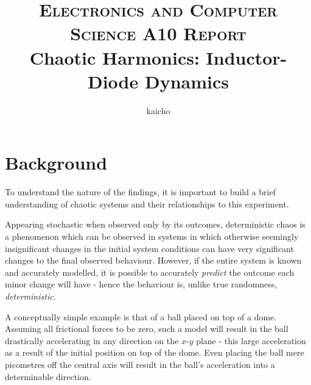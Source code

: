 \documentclass[10pt,twocolumn,letterpaper]{article}
\title{
		\usefont{OT1}{bch}{b}{n}
		\normalfont \normalsize \textsc{Electronics and Computer Science A10 Report} \\ [10pt]
		\huge Chaotic Harmonics: Inductor-Diode Dynamics \\
}
\author[1]{kaicho}
\affil[1]{University of Southampton}
\begin{document}
\maketitle


\section{Background}
To understand the nature of the findings, it is important to build a brief understanding of chaotic systems and their relationships to this experiment.

Appearing stochastic when observed only by its outcomes, deterministic chaos is a phenomenon which can be observed in systems in which otherwise seemingly insignificant changes in the initial system conditions can have very significant changes to the final observed behaviour.  However, if the entire system is known and accurately modelled, it is possible to accurately \textit{predict} the outcome each minor change will have - hence the behaviour is, unlike true randomness, \textit{deterministic}.  

A conceptually simple example is that of a ball placed on top of a dome.  Assuming all frictional forces to be zero, such a model will result in the ball drastically accelerating in any direction on the \(x\)-\(y\) plane - this large acceleration as a result of the initial position on top of the dome.  Even placing the ball mere picometres off the central axis will result in the ball's acceleration into a determinable direction.
\end{document}
